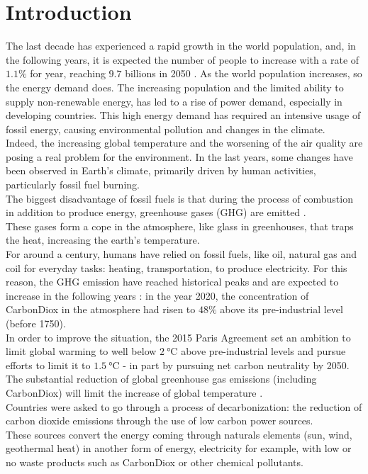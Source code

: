 \chapter{Introduction}

%
The last decade has experienced a rapid growth in the world population, and, in the following years, it is expected the number of people to increase with a rate of $1.1\%$ for year, reaching $9.7$ billions in 2050 \cite{wpp}. As the world population increases, so the energy demand does. The increasing population and the limited ability to supply non-renewable energy, has led to a rise of power demand, especially in developing countries. This high energy demand has required an intensive usage of fossil energy, causing environmental pollution and changes in the climate.\\ 
Indeed, the increasing global temperature and the worsening of the air quality are posing a real problem for the environment. In the last years, some changes have been observed in Earth’s climate, primarily driven by human activities, particularly fossil fuel burning. \\

The biggest disadvantage of fossil fuels is that during the process of combustion in addition to produce energy, greenhouse gases (\gls{GHG}) are emitted \cite{greenhousegasemissions}. \\
These gases form a cope in the atmosphere, like glass in greenhouses, that traps the heat, increasing the earth's temperature. \\
For around a century, humans have relied on fossil fuels, like oil, natural gas and coil for everyday tasks: heating, transportation, to produce electricity. For this reason, the \gls{GHG} emission have reached historical peaks and are expected to increase in the following years \cite{co2predic}: in the year 2020, the concentration of \gls{CarbonDiox} in the atmosphere had risen to $48\%$ above its pre-industrial level (before 1750). \\

In order to improve the situation, the 2015 Paris Agreement set an ambition to limit global warming to well below $\SI{2}{\degreeCelsius}$ above pre-industrial levels and pursue efforts to limit it to $\SI{1.5}{\degreeCelsius}$ - in part by pursuing net carbon neutrality by 2050. The substantial reduction of global greenhouse gas emissions (including \gls{CarbonDiox})  will limit the increase of global temperature \cite{french_conference}. \\
Countries were asked to go through a process of decarbonization: the reduction of carbon dioxide emissions through the use of low carbon power sources. \\
These sources convert the energy coming through naturals elements (sun, wind, geothermal heat) in another form of energy, electricity for example, with low or no waste products such as \gls{CarbonDiox} or other chemical pollutants. 

